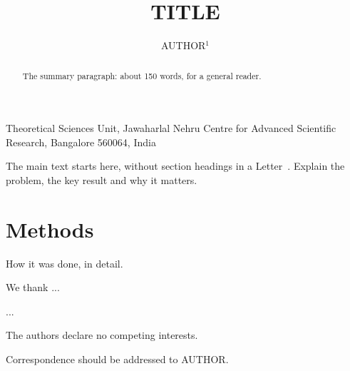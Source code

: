 \documentclass{nature}
\title{{{TITLE}}}
\author{{{AUTHOR}}$^{1}$}
\begin{document}
\maketitle

\begin{affiliations}
 \item Theoretical Sciences Unit, Jawaharlal Nehru Centre for Advanced Scientific Research, Bangalore 560064, India
\end{affiliations}

\begin{abstract}
The summary paragraph: about 150 words, for a general reader.
\end{abstract}

The main text starts here, without section headings in a Letter~\cite{hubbard1963}. Explain the
problem, the key result and why it matters.

\section*{Methods}
How it was done, in detail.



\begin{addendum}
 \item[Acknowledgements] We thank ...
 \item[Author contributions] ...
 \item[Competing interests] The authors declare no competing interests.
 \item[Correspondence] Correspondence should be addressed to {{AUTHOR}}.
\end{addendum}
\end{document}
